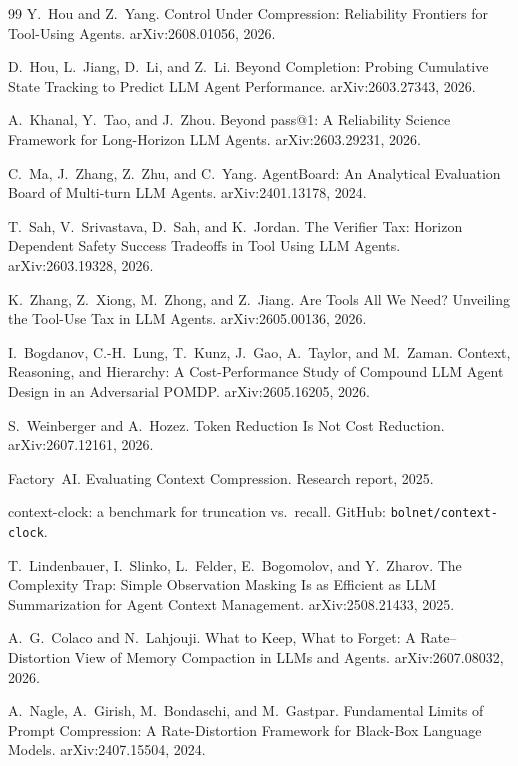 \documentclass[11pt]{article}
\begin{document}
\begin{thebibliography}{99}
 Y.~Hou and Z.~Yang. Control Under Compression: Reliability Frontiers for
  Tool-Using Agents. arXiv:2608.01056, 2026.

 D.~Hou, L.~Jiang, D.~Li, and Z.~Li. Beyond Completion: Probing Cumulative State
  Tracking to Predict LLM Agent Performance. arXiv:2603.27343, 2026.

 A.~Khanal, Y.~Tao, and J.~Zhou. Beyond pass@1: A Reliability Science Framework
  for Long-Horizon LLM Agents. arXiv:2603.29231, 2026.

 C.~Ma, J.~Zhang, Z.~Zhu, and C.~Yang. AgentBoard: An Analytical Evaluation
  Board of Multi-turn LLM Agents. arXiv:2401.13178, 2024.

 T.~Sah, V.~Srivastava, D.~Sah, and K.~Jordan. The Verifier Tax: Horizon
  Dependent Safety Success Tradeoffs in Tool Using LLM Agents. arXiv:2603.19328, 2026.

 K.~Zhang, Z.~Xiong, M.~Zhong, and Z.~Jiang. Are Tools All We Need? Unveiling the
  Tool-Use Tax in LLM Agents. arXiv:2605.00136, 2026.

 I.~Bogdanov, C.-H.~Lung, T.~Kunz, J.~Gao, A.~Taylor, and M.~Zaman. Context,
  Reasoning, and Hierarchy: A Cost-Performance Study of Compound LLM Agent Design in an
  Adversarial POMDP. arXiv:2605.16205, 2026.

 S.~Weinberger and A.~Hozez. Token Reduction Is Not Cost Reduction.
  arXiv:2607.12161, 2026.

 Factory~AI. Evaluating Context Compression. Research report, 2025.

 context-clock: a benchmark for truncation vs.\ recall. GitHub:
  \texttt{bolnet/context-clock}.

 T.~Lindenbauer, I.~Slinko, L.~Felder, E.~Bogomolov, and Y.~Zharov.
  The Complexity Trap: Simple Observation Masking Is as Efficient as LLM Summarization for
  Agent Context Management. arXiv:2508.21433, 2025.

 A.~G.~Colaco and N.~Lahjouji. What to Keep, What to Forget: A
  Rate--Distortion View of Memory Compaction in LLMs and Agents. arXiv:2607.08032, 2026.

 A.~Nagle, A.~Girish, M.~Bondaschi, and M.~Gastpar. Fundamental Limits of Prompt
  Compression: A Rate-Distortion Framework for Black-Box Language Models. arXiv:2407.15504, 2024.

\end{thebibliography}
\end{document}
